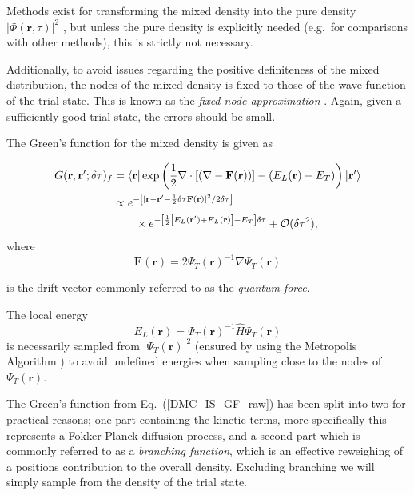 \documentclass[amsmath, amssymb, aps, floatfix, nofootinbib, preprintnumbers,showpacs, superscriptaddress, twocolumn]{revtex4-1}
\newcommand{\OP}[1]{{\hat{#1}}}
\newcommand{\ket}[1]{\left| #1 \right>}
\newcommand{\bra}[1]{\left< #1 \right|}
\begin{document}
Methods exist for transforming the mixed density into the pure density $|\Phi(\mathbf{r}, \tau)|^2$ \cite{abInitioMC}, but unless the pure density is explicitly needed (e.g.~for comparisons with other methods), this is strictly not necessary.

Additionally, to avoid issues regarding the positive definiteness of the mixed distribution, the nodes of the mixed density is fixed to those of the wave function of the trial state. This is known as the \textit{fixed node approximation} \cite{umrigar:2865, abInitioMC}. Again, given a sufficiently good trial state, the errors should be small.

The Green's function for the mixed density is given as \cite{umrigar:2865}

\begin{align}
  G(\mathbf{r}, \mathbf{r}'; \delta\tau)_f &= \bra{\mathbf{r}} \exp\left({\frac{1}{2}\nabla\cdot \left[\left(\nabla - \mathbf{F}(\mathbf{r})\right)\right] - \left(E_L(\mathbf{r}) - E_T\right)}\right)\ket{\mathbf{r}'} \label{eq:DMC_IS_GF_raw}\\
  &\propto e^{-\left[|\mathbf{r} - \mathbf{r}' - \frac{1}{2}\delta\tau\mathbf{F}(\mathbf{r})|^2/2\delta\tau\right]} \label{eq:DMC_IS_GF}\\
  &\qquad\times e^{-\left[\frac{1}{2}\left[E_L(\mathbf{r'}) + E_L(\mathbf{r})\right] - E_T\right]\delta\tau} + \mathcal{O}(\delta\tau^2), \notag
\end{align}
where
\begin{equation}
  \mathbf{F}(\mathbf{r}) = 2\Psi_T(\mathbf{r})^{-1} \nabla \Psi_T(\mathbf{r})
\end{equation}

\noindent
is the drift vector commonly referred to as the \textit{quantum force}.

The local energy
\begin{equation}
E_L(\mathbf{r}) = \Psi_T(\mathbf{r})^{-1}\OP{H} \Psi_T(\mathbf{r})
\end{equation}
is necessarily sampled from $|\Psi_T(\mathbf{r})|^2$ (ensured by using the Metropolis Algorithm \cite{abInitioMC}) to avoid undefined energies when sampling close to the nodes of $\Psi_T(\mathbf{r})$.

The Green's function from Eq.~(\ref{DMC_IS_GF_raw}) has been split into two for practical reasons; one part containing the kinetic terms, more specifically this represents a Fokker-Planck diffusion process, and a second part which is commonly referred to as a \textit{branching function}, which is an effective reweighing of a positions contribution to the overall density. Excluding branching we will simply sample from the density of the trial state.
\end{document}
